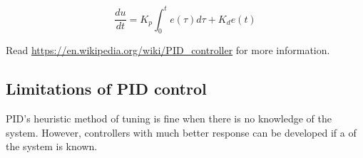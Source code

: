 \begin{equation}
  \frac{du}{dt} = K_p \int_0^t e(\tau) d\tau + K_d e(t)
\end{equation}

Read \url{https://en.wikipedia.org/wiki/PID_controller} for more information.

\subsection{Limitations of PID control}

PID's heuristic method of tuning is fine when there is no knowledge of the
\gls{system}. However, controllers with much better response can be developed if
a  of the \gls{system} is known.
